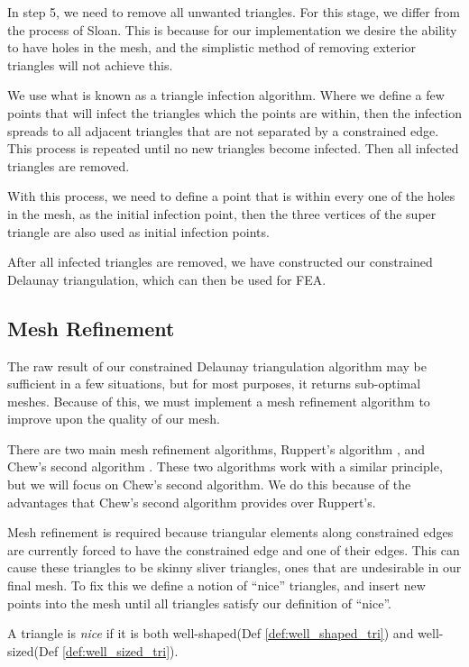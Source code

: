 \documentclass[../fem.tex]{subfiles}
\begin{document}
In step 5, we need to remove all unwanted triangles. For this stage, we differ
from the process of Sloan. This is because for our implementation we desire the
ability to have holes in the mesh, and the simplistic method of removing
exterior triangles will not achieve this.

We use what is known as a triangle infection algorithm. Where we define a few
points that will infect the triangles which the points are within, then the
infection spreads to all adjacent triangles that are not separated by a
constrained edge. This process is repeated until no new triangles become
infected. Then all infected triangles are removed.

With this process, we need to define a point that is within every one of the
holes in the mesh, as the initial infection point, then the three vertices of
the super triangle are also used as initial infection points.

After all infected triangles are removed, we have constructed our constrained
Delaunay triangulation, which can then be used for FEA.

\subsection{Mesh Refinement}%
\label{sub:mesh_refinement}

The raw result of our constrained Delaunay triangulation algorithm may be
sufficient in a few situations, but for most purposes, it returns sub-optimal
meshes. Because of this, we must implement a mesh refinement algorithm to
improve upon the quality of our mesh.

There are two main mesh refinement algorithms, Ruppert's algorithm
\cite{R_REF}, and Chew's second algorithm \cite{C_REF}. These two algorithms
work with a similar principle, but we will focus on Chew's second algorithm. We
do this because of the advantages that Chew's second algorithm provides over
Ruppert's.

Mesh refinement is required because triangular elements along constrained
edges are currently forced to have the constrained edge and one of their edges.
This can cause these triangles to be skinny sliver triangles, ones that are
undesirable in our final mesh. To fix this we define a notion of ``nice''
triangles, and insert new points into the mesh until all triangles satisfy
our definition of ``nice''.

\begin{definition} \label{def:nice_tri}
  A triangle is \textit{nice} if it is both well-shaped(Def
  \ref{def:well_shaped_tri}) and well-sized(Def \ref{def:well_sized_tri}).
\end{definition}
\end{document}
